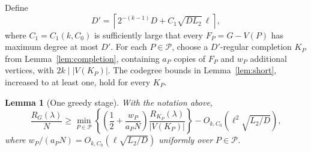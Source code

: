 \documentclass[11pt,reqno]{amsart}
\numberwithin{equation}{section}
\theoremstyle{plain}
\newtheorem{lemma}[theorem]{Lemma}
\theoremstyle{definition}
\begin{document}
Define
\[
    D'=\left\lceil2^{-(k-1)}D+C_1\sqrt{DL_2}\,\ell\right\rceil,
\]
where $C_1=C_1(k,C_0)$ is sufficiently large that every $F_P=G-V(P)$ has maximum degree at most $D'$.
For each $P\in\mathcal P$, choose a $D'$-regular completion $K_P$ from Lemma~\ref{lem:completion}, containing $a_P$ copies of $F_P$ and $w_P$ additional vertices, with $2k\mid |V(K_P)|$.
The codegree bounds in Lemma~\ref{lem:short}, increased to at least one, hold for every $K_P$.

\begin{lemma}[One greedy stage]\label{lem:stage}
    With the notation above,
    \[
        \frac{R_G(\lambda)}N\ge
        \min_{P\in\mathcal P}\left\{
        \left(\frac12+\frac{w_P}{a_PN}\right)
        \frac{R_{K_P}(\lambda)}{|V(K_P)|}\right\}
        -O_{k,C_0}\left(\ell^2\sqrt{L_2/D}\right),
    \]
    where $w_P/(a_PN)=O_{k,C_0}(\ell\sqrt{L_2/D})$ uniformly over $P\in\mathcal P$.
\end{lemma}
\end{document}
